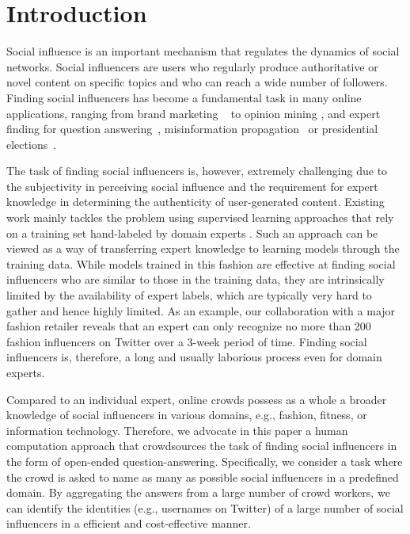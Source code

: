 \section{Introduction}

Social influence is an important mechanism that regulates the dynamics of social networks. Social influencers are users who regularly produce authoritative or novel content on specific topics and who can reach a wide number of followers. Finding social influencers has become a fundamental task in many online applications, ranging from brand marketing
~\cite{richardson2002mining,van2007new} to opinion mining \cite{pang2008opinion,li2012mining}, and expert finding for question 
answering~\cite{riahi2012finding}, misinformation propagation~\cite{DBLP:conf/icde/SongHL17} or presidential elections~\cite{bond201261}.

The task of finding social influencers is, however, extremely challenging due to the subjectivity in perceiving social influence and the requirement for expert knowledge in determining the authenticity of user-generated content. Existing work mainly tackles the problem using supervised learning approaches that rely on a training set hand-labeled by domain experts \cite{Cheng2014,Lehmann2013,wei2016learning}. Such an approach can be viewed as a way of transferring expert knowledge to learning models through the training data. While models trained in this fashion are effective at finding social influencers who are similar to those in the training data, they are intrinsically limited by the availability of expert labels, which are typically very hard to gather and hence highly limited. As an example, our collaboration with a major fashion retailer reveals that an expert can only recognize no more than 200 fashion influencers on Twitter over a 3-week period of time. Finding social influencers is, therefore, a long and usually laborious process even for domain experts.

Compared to an individual expert, online crowds 
possess as a whole a broader knowledge of social influencers in various domains, e.g., fashion, fitness, or information technology. Therefore, we advocate in this paper a human computation approach that crowdsources the task of finding social influencers in the form of open-ended question-answering. Specifically, we consider a task where the crowd is asked to name as many as possible social influencers in a predefined domain. By aggregating the answers from a large number of crowd workers, we can identify the identities (e.g., usernames on Twitter) of a large number of social influencers in a efficient and cost-effective manner. 

